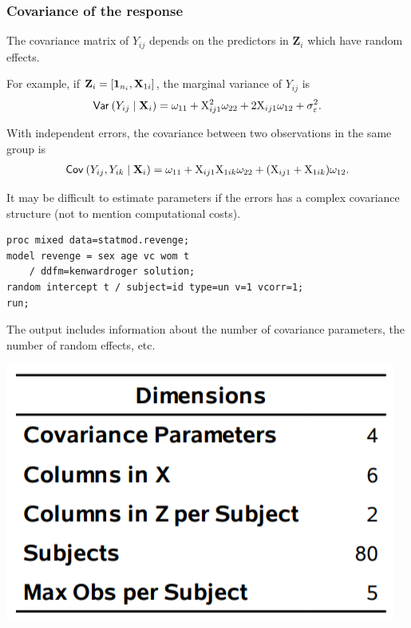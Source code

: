 \documentclass{beamer}
\begin{document}
\begin{frame}
\frametitle{Covariance of the response}
\bi
\item The covariance matrix of $Y_{ij}$ depends on the predictors in $\mathbf{Z}_i$ which have random effects.
\item For example, if $\mathbf{Z}_{i} = [\boldsymbol {1}_{n_i}, \mathbf{X}_{1i}]$, the marginal variance of $Y_{ij}$ is
\begin{align*}
{\mathsf{Var}_{}}\left(Y_{ij}\mid \mathbf{X}_i\right)=\omega_{11}+\mathrm{X}_{ij1}^2 \omega_{22} + 2\mathrm{X}_{ij1} \omega_{12}+\sigma^2_{\varepsilon}.
\end{align*}
\item With independent errors, the covariance between two observations in the same group is
\begin{align*}
{\mathsf{Cov}_{}}\left(Y_{ij}, Y_{ik}\mid \mathbf{X}_i\right)=\omega_{11}+\mathrm{X}_{ij1}\mathrm{X}_{1ik}\omega_{22}+(\mathrm{X}_{ij1}+\mathrm{X}_{1ik})\omega_{12}.
\end{align*}
\item It may be difficult to estimate parameters if the errors has a complex covariance structure (not to mention computational costs).
\ei
\end{frame}

\begin{frame}[fragile]
\begin{tcolorbox}[colback=white, colframe=hecblue, title=\SASlang{} code for random slope model]
\begin{verbatim}
proc mixed data=statmod.revenge;
model revenge = sex age vc wom t 
    / ddfm=kenwardroger solution;
random intercept t / subject=id type=un v=1 vcorr=1;
run;
\end{verbatim}
\end{tcolorbox}
The output includes information about the number of covariance parameters, the number of random effects, etc.
\begin{center}
\includegraphics[width = 0.35\linewidth]{img/c6/slides7-e23}
\end{center}
\end{frame}
%  
\end{document}
